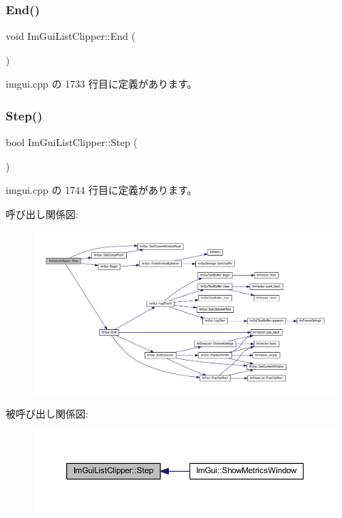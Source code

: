 \subsubsection{\texorpdfstring{End()}{End()}}
{\footnotesize\ttfamily void Im\+Gui\+List\+Clipper\+::\+End (\begin{DoxyParamCaption}{ }\end{DoxyParamCaption})}



 imgui.\+cpp の 1733 行目に定義があります。

\mbox{\label{struct_im_gui_list_clipper_ac3e115812c3c4e5a39578a7aa955379a}} 
\subsubsection{\texorpdfstring{Step()}{Step()}}
{\footnotesize\ttfamily bool Im\+Gui\+List\+Clipper\+::\+Step (\begin{DoxyParamCaption}{ }\end{DoxyParamCaption})}



 imgui.\+cpp の 1744 行目に定義があります。

呼び出し関係図\+:\nopagebreak
\begin{figure}[H]
\begin{center}
\leavevmode
\includegraphics[width=350pt]{struct_im_gui_list_clipper_ac3e115812c3c4e5a39578a7aa955379a_cgraph}
\end{center}
\end{figure}
被呼び出し関係図\+:\nopagebreak
\begin{figure}[H]
\begin{center}
\leavevmode
\includegraphics[width=350pt]{struct_im_gui_list_clipper_ac3e115812c3c4e5a39578a7aa955379a_icgraph}
\end{center}
\end{figure}


